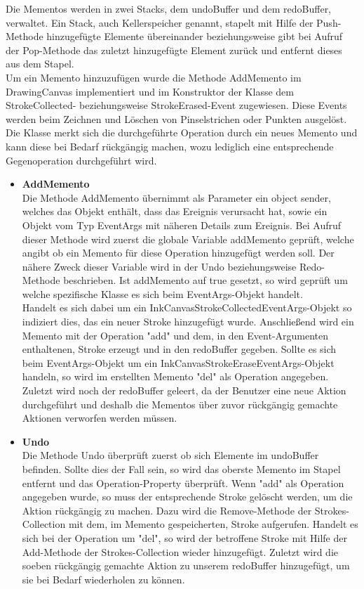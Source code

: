 Die Mementos werden in zwei Stacks, dem undoBuffer und dem redoBuffer, verwaltet. Ein Stack, auch Kellerspeicher genannt, stapelt mit Hilfe der Push-Methode hinzugefügte Elemente übereinander beziehungsweise gibt bei Aufruf der Pop-Methode das zuletzt hinzugefügte Element zurück und entfernt dieses aus dem Stapel.\\
Um ein Memento hinzuzufügen wurde die Methode AddMemento im DrawingCanvas implementiert und im Konstruktor der Klasse dem StrokeCollected- beziehungsweise StrokeErased-Event zugewiesen. Diese Events werden beim Zeichnen und Löschen von Pinselstrichen oder Punkten ausgelöst. Die Klasse merkt sich die durchgeführte Operation durch ein neues Memento und kann diese bei Bedarf rückgängig machen, wozu lediglich eine entsprechende Gegenoperation durchgeführt wird.
\begin{itemize}
\item \textbf{AddMemento}\\
Die Methode AddMemento übernimmt als Parameter ein object sender, welches das Objekt enthält, dass das Ereignis verursacht hat, sowie ein Objekt vom Typ EventArgs mit näheren Details zum Ereignis. Bei Aufruf dieser Methode wird zuerst die globale Variable addMemento geprüft, welche angibt ob ein Memento für diese Operation hinzugefügt werden soll. Der nähere Zweck dieser Variable wird in der Undo beziehungsweise Redo-Methode beschrieben. Ist addMemento auf true gesetzt, so wird geprüft um welche spezifische Klasse es sich beim EventArgs-Objekt handelt.\\
Handelt es sich dabei um ein InkCanvasStrokeCollectedEventArgs-Objekt so indiziert dies, das ein neuer Stroke hinzugefügt wurde. Anschließend wird ein Memento mit der Operation "add" und dem, in den Event-Argumenten enthaltenen, Stroke erzeugt und in den redoBuffer gegeben. Sollte es sich beim EventArgs-Objekt um ein InkCanvasStrokeEraseEventArgs-Objekt handeln, so wird im erstellten Memento "del" als Operation angegeben. Zuletzt wird noch der redoBuffer geleert, da der Benutzer eine neue Aktion durchgeführt und deshalb die Mementos über zuvor rückgängig gemachte Aktionen verworfen werden müssen.
\item \textbf{Undo}\\
Die Methode Undo überprüft zuerst ob sich Elemente im undoBuffer befinden. Sollte dies der Fall sein, so wird das oberste Memento im Stapel entfernt und das Operation-Property überprüft. Wenn "add" als Operation angegeben wurde, so muss der entsprechende Stroke gelöscht werden, um die Aktion rückgängig zu machen. Dazu wird die Remove-Methode der Strokes-Collection mit dem, im Memento gespeicherten, Stroke aufgerufen. Handelt es sich bei der Operation um "del", so wird der betroffene Stroke mit Hilfe der Add-Methode der Strokes-Collection wieder hinzugefügt. Zuletzt wird die soeben rückgängig gemachte Aktion zu unserem redoBuffer hinzugefügt, um sie bei Bedarf wiederholen zu können.\\

\end{itemize}
